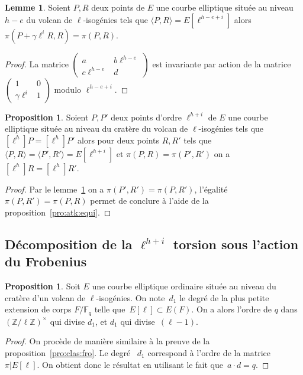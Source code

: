 \documentclass[10pt,a4paper]{book}
\theoremstyle{plain}
\theoremstyle{definition}
\newtheorem{lem}[thm]{Lemme}
\theoremstyle{definition}
\theoremstyle{definition}
\newtheorem{prop}[thm]{Proposition}
\theoremstyle{definition}
\theoremstyle{remark}
\theoremstyle{remark}
\theoremstyle{definition}
\begin{document}
\begin{lem}
\label{lem:fro:atk}
Soient $P,R$ deux points de $E$ une courbe elliptique située au 
niveau $h-e$ du volcan de $\ell$-isogénies tels que $\langle P,R \rangle= 
E[\ell^{h-e+i}]$ alors $\pi(P+\gamma \ell^{i}R,R)=\pi(P,R)$.
\end{lem}

\begin{proof}
La matrice $\left( \begin{smallmatrix}a & b\ell^{h-e} \\c\ell^{h-e}  & d \end{smallmatrix} 
\right)$ est invariante par action de la matrice $\left( 
\begin{smallmatrix}1 & 0 \\\gamma\ell^{i}  & 1 \end{smallmatrix} 
\right)$ modulo $\ell^{h-e+i}$.
\end{proof}

\begin{prop}
Soient $P,P'$ deux points d'ordre $\ell^{h+i}$ de $E$ une courbe elliptique 
située au niveau du cratère du volcan de $\ell$-isogénies tels que $[\ell^{h}]P=
[\ell^{h}]P'$ alors pour deux points $R,R'$ tels que $\langle P, R \rangle = 
\langle P', R' \rangle=E[\ell^{h+i}]$ et $\pi(P,R)=\pi(P',R')$ on a 
$[\ell^{h}]R=[\ell^{h}]R'$.
\end{prop}

\begin{proof}
Par le lemme~\ref{lem:fro:atk} on a $\pi(P',R')=\pi(P,R')$, l'égalité 
$\pi(P,R')=\pi(P,R)$ permet de conclure à l'aide de la 
proposition~\ref{pro:atk:equi}.
\end{proof}

\subsection{Décomposition de la $\ell^{h+i}$ torsion sous l'action du Frobenius}

\begin{prop}
Soit $E$ une courbe elliptique ordinaire située au niveau du cratère d'un 
volcan de $\ell$-isogénies. On note~$d_1$ le degré de la plus 
petite extension de corps $F/\mathbb{F}_q$ telle que~$E[\ell]\subset E(F)$. 
On  a alors l'ordre de $q$ dans $(\mathbb{Z}/ \ell \mathbb{Z})^\times$ qui divise $d_1$,
et $d_1$ qui divise~$(\ell-1)$.
\end{prop}

\begin{proof}
On procède de manière similaire à la preuve de la proposition~\ref{pro:clas:fro}.
Le degré ~$d_1$ correspond à l'ordre de la matrice~$\pi|E[\ell]$.
On obtient donc le résultat en utilisant le fait que~$a \cdot d = q$.
\end{proof}
\end{document}
